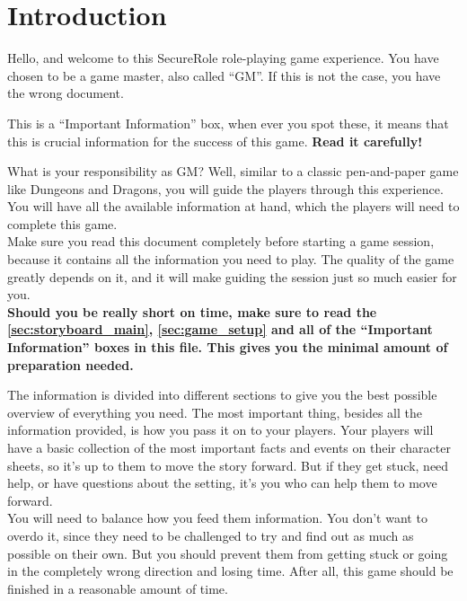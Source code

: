\chapter{Introduction}

Hello, and welcome to this SecureRole role-playing game experience.
You have chosen to be a game master, also called \enquote{GM}.
If this is not the case, you have the wrong document.
\\

\begin{hint}
    This is a \enquote{Important Information} box, when ever you spot these, it means that this is crucial information for the success of this game.
    \textbf{Read it carefully!}
\end{hint}

\begin{hint}
    What is your responsibility as GM?
    Well, similar to a classic pen-and-paper game like Dungeons and Dragons, you will guide the players through this experience.
    You will have all the available information at hand, which the players will need to complete this game.
    \\

    Make sure you read this document completely before starting a game session, because it contains all the information you need to play.
    The quality of the game greatly depends on it, and it will make guiding the session just so much easier for you.
    \\

    \textbf{Should you be really short on time, make sure to read the \autoref{sec:storyboard_main}, \autoref{sec:game_setup} and all of the \enquote{Important Information} boxes in this file.
        This gives you the minimal amount of preparation needed.}
\end{hint}

The information is divided into different sections to give you the best possible overview of everything you need.
The most important thing, besides all the information provided, is how you pass it on to your players.
Your players will have a basic collection of the most important facts and events on their character sheets, so it's up to them to move the story forward.
But if they get stuck, need help, or have questions about the setting, it's you who can help them to move forward.
\\

You will need to balance how you feed them information.
You don't want to overdo it, since they need to be challenged to try and find out as much as possible on their own.
But you should prevent them from getting stuck or going in the completely wrong direction and losing time.
After all, this game should be finished in a reasonable amount of time.
\\

